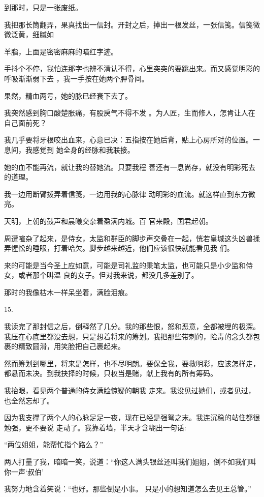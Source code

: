 \documentclass{article}
\begin{document}
到那时，只是一张废纸。 

我把那长筒翻弄，果真找出一信封。开封之后，掉出一根发丝，一张信笺。信笺微微泛黄，细腻如
\newpage

羊脂，上面是密密麻麻的暗红字迹。 

手抖个不停，我怕连那字也辨不清认不得，心里突突的要跳出来。而又感觉明彩的呼吸渐渐弱下去
，我一手按在她两个胛骨间。 


果然，精血两亏，她的脉已经衰下去了。 

我突然感到胸口酸楚胀痛，有股戾气不得不发
。为人匠，生而修人，怎肯让人在自己面前死？ 

我几乎要将牙根咬出血来，心意已决：五指按在她后背，贴上心房所对的位置。一息间，我感觉到
她全身的经脉和我联接。 

她的血不能再流，就让我的替她流。只要我程
善还有一息尚存，就没有明彩死去的道理。 

我一边用断臂拨弄着信笺，一边用我的心脉律
动明彩的血流。就这样直到东方微亮。 

\newpage

天明，上朝的鼓声和晨曦交杂着盈满内城。百
官来殿，国君起朝。 

周遭喧杂了起来，是侍女，太监和群臣的脚步声交叠在一起，恍若皇城这头凶兽揉弄惺忪的睡眼，打着哈欠。脚步越来越近，他们应该很快就能看见我
们。 

来的可能是当今圣上应如意，可能是司礼监的秉笔太监，也可能只是小少监和侍女，或者那个叫温
良的女子。但对我来说，都没几多差别了。 


那时的我像枯木一样呆坐着，满脸泪痕。 


15. 

我读完了那封信之后，倒释然了几分。我的那些恨，怒和恶意，全都被埋的极深。我压在心底里都没去想，只是想着将来的筹划。我把那些带刺的，险毒的念头都包裹的精致圆滑，用笑脸把自己裹起来。

\newpage

然而筹划到哪里，将来是怎样，也不尽明朗。要保全我，要救明彩，应该怎样走，都悬而未决。到我抉择的时候，只权当是赌，献上我有的所有筹码。

我抬眼，看见两个普通的侍女满脸惊疑的朝我
走来。我没见过她们，或者见过，也全然忘却了。 

因为我支撑了两个人的心脉足足一夜，现在已经是强弩之末。我连沉稳的站住都很勉强，更不要说
走动了。我靠着墙，半天才含糊出一句话: 


“两位姐姐，能帮忙指个路么？” 

两人打量了我，暗暗一笑，说道：“你这人满头银丝还叫我们姐姐，倒不如我们叫你一声‘叔伯’

我努力地含着笑说：“也好。那些倒是小事。
只是小的想知道怎么去见王总管。” 
\end{document}
